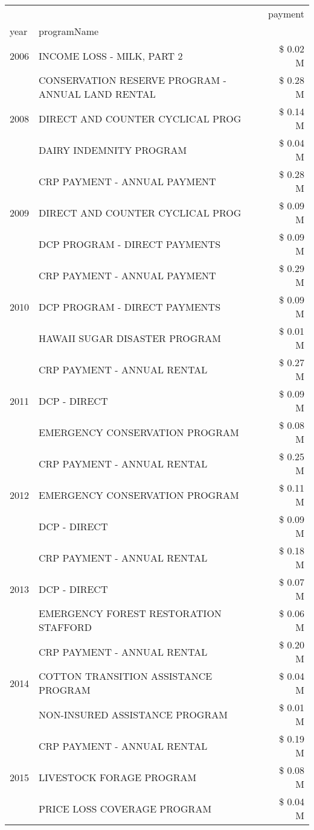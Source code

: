 \begin{tabular}{llr}
\toprule
 &  & payment \\
year & programName &  \\
\midrule
2006 & INCOME LOSS - MILK, PART 2 & \$ 0.02 M \\
\cline{1-3}
\multirow[t]{3}{*}{2008} & CONSERVATION RESERVE PROGRAM - ANNUAL LAND RENTAL & \$ 0.28 M \\
 & DIRECT AND COUNTER CYCLICAL PROG & \$ 0.14 M \\
 & DAIRY INDEMNITY PROGRAM & \$ 0.04 M \\
\cline{1-3}
\multirow[t]{3}{*}{2009} & CRP PAYMENT - ANNUAL PAYMENT & \$ 0.28 M \\
 & DIRECT AND COUNTER CYCLICAL PROG & \$ 0.09 M \\
 & DCP PROGRAM - DIRECT PAYMENTS & \$ 0.09 M \\
\cline{1-3}
\multirow[t]{3}{*}{2010} & CRP PAYMENT - ANNUAL PAYMENT & \$ 0.29 M \\
 & DCP PROGRAM - DIRECT PAYMENTS & \$ 0.09 M \\
 & HAWAII SUGAR DISASTER PROGRAM & \$ 0.01 M \\
\cline{1-3}
\multirow[t]{3}{*}{2011} & CRP PAYMENT - ANNUAL RENTAL & \$ 0.27 M \\
 & DCP - DIRECT & \$ 0.09 M \\
 & EMERGENCY CONSERVATION PROGRAM & \$ 0.08 M \\
\cline{1-3}
\multirow[t]{3}{*}{2012} & CRP PAYMENT - ANNUAL RENTAL & \$ 0.25 M \\
 & EMERGENCY CONSERVATION PROGRAM & \$ 0.11 M \\
 & DCP - DIRECT & \$ 0.09 M \\
\cline{1-3}
\multirow[t]{3}{*}{2013} & CRP PAYMENT - ANNUAL RENTAL & \$ 0.18 M \\
 & DCP - DIRECT & \$ 0.07 M \\
 & EMERGENCY FOREST RESTORATION STAFFORD & \$ 0.06 M \\
\cline{1-3}
\multirow[t]{3}{*}{2014} & CRP PAYMENT - ANNUAL RENTAL & \$ 0.20 M \\
 & COTTON TRANSITION ASSISTANCE PROGRAM & \$ 0.04 M \\
 & NON-INSURED ASSISTANCE PROGRAM & \$ 0.01 M \\
\cline{1-3}
\multirow[t]{3}{*}{2015} & CRP PAYMENT - ANNUAL RENTAL & \$ 0.19 M \\
 & LIVESTOCK FORAGE PROGRAM & \$ 0.08 M \\
 & PRICE LOSS COVERAGE PROGRAM & \$ 0.04 M \\

\end{tabular}
